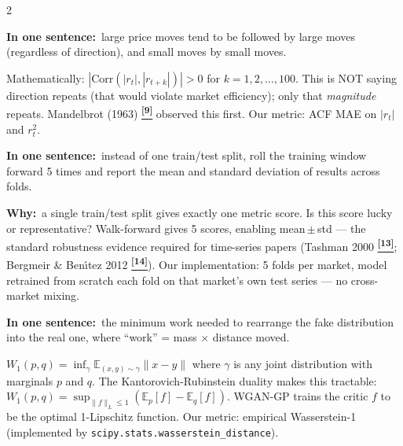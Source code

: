 \documentclass[10pt]{article}
\newcommand{\indigobox}[2]{\begin{tcolorbox}[mybox={Indigo}{IBg},title={#1}]#2\end{tcolorbox}}
\newcommand{\tcite}[1]{%
  \hyperlink{R:#1}{\textsuperscript{\scriptsize\textbf{[#1]}}}}
\newcommand{\E}{\mathbb{E}}
\begin{document}
\begin{multicols}{2}
\indigobox{Volatility Clustering}{%
\textbf{In one sentence:}\ large price moves tend to be followed by large moves (regardless of direction), and small moves by small moves.

Mathematically: $|\text{Corr}(|r_t|, |r_{t+k}|)| > 0$ for $k = 1, 2, \ldots, 100$. This is NOT saying direction repeats (that would violate market efficiency); only that \emph{magnitude} repeats. Mandelbrot (1963)\tcite{9} observed this first. Our metric: ACF MAE on $|r_t|$ and $r_t^2$.}

\indigobox{Walk-Forward Validation}{%
\textbf{In one sentence:}\ instead of one train/test split, roll the training window forward 5 times and report the mean and standard deviation of results across folds.

\textbf{Why:}\ a single train/test split gives exactly one metric score. Is this score lucky or representative? Walk-forward gives 5 scores, enabling mean\,$\pm$\,std --- the standard robustness evidence required for time-series papers (Tashman 2000\tcite{13}; Bergmeir \& Ben\'{\i}tez 2012\tcite{14}). Our implementation: 5 folds per market, model retrained from scratch each fold on that market's own test series --- no cross-market mixing.}

\indigobox{Wasserstein Distance}{%
\textbf{In one sentence:}\ the minimum work needed to rearrange the fake distribution into the real one, where ``work'' = mass × distance moved.

$W_1(p,q) = \inf_\gamma \E_{(x,y) \sim \gamma}\|x-y\|$ where $\gamma$ is any joint distribution with marginals $p$ and $q$. The Kantorovich-Rubinstein duality makes this tractable: $W_1(p,q) = \sup_{\|f\|_L \leq 1}(\E_p[f] - \E_q[f])$. WGAN-GP trains the critic $f$ to be the optimal 1-Lipschitz function. Our metric: empirical Wasserstein-1 (implemented by \texttt{scipy.stats.wasserstein\_distance}).}


\end{multicols}
\end{document}

